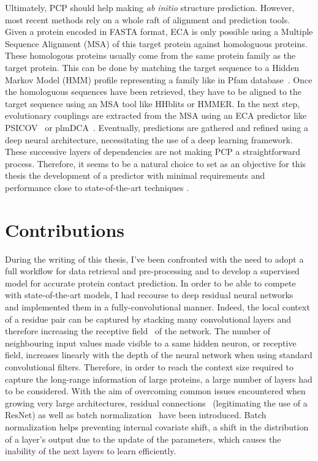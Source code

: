     Ultimately, PCP should help making \textit{ab initio} structure prediction.
    However, most recent methods rely on a whole raft of alignment and prediction tools.
    Given a protein encoded in FASTA format, ECA is only possible using a Multiple Sequence Alignment (MSA)
    of this target protein against homologuous proteins.
    These homologous proteins usually come from the same protein family
    as the target protein.
    This can be done by matching the target sequence to a Hidden Markov Model (HMM) profile representing a family
    like in Pfam database~\cite{Pfam}. Once the homologuous sequences have been retrieved, they have to be aligned to
    the target sequence using an MSA tool like HHblits or HMMER. In the next step, evolutionary couplings are extracted from
    the MSA using an ECA predictor like PSICOV~\cite{doi:10.1093/bioinformatics/btr638} or plmDCA~\cite{EKEBERG2014341}.
    Eventually, predictions are gathered and refined using a deep neural architecture, necessitating the use
    of a deep learning framework. These successive layers of dependencies are not making PCP a straightforward process.
    Therefore, it seems to be a natural choice to set as an objective for this thesis the development of a predictor with
    minimal requirements and performance close to state-of-the-art techniques
    \cite{RaptorX, DeepContact, doi:10.1093/bioinformatics/bty341, Michel383133, DeepMind}.

\section{Contributions}

    During the writing of this thesis, I've been confronted with the need to
    adopt a full workflow for data retrieval and pre-processing and to develop a supervised
    model for accurate protein contact prediction. In order to be able to compete
    with state-of-the-art models, I had recourse to deep residual
    neural networks~\cite{DBLP:journals/corr/HeZRS15} and implemented them in a
    fully-convolutional manner.
    Indeed, the local context of a residue pair can be captured by stacking many
    convolutional layers and therefore increasing the receptive field~\cite{Hubel1962}
    of the network. The number of neighbouring input values made visible to a same hidden neuron,
    or receptive field, increases linearly with the depth
    of the neural network when using standard convolutional filters.
    Therefore, in order to reach the context size required to capture the long-range information
    of large proteins, a large number of layers had to be considered.
    With the aim of overcoming common issues
    encountered when growing very large architectures,
    residual connections~\cite{DBLP:journals/corr/HeZRS15}
    (legitimating the use of a ResNet) as well as batch
    normalization~\cite{DBLP:journals/corr/IoffeS15} have been introduced.
    Batch normalization helps preventing internal covariate shift,
    a shift in the distribution of a layer's output due to the update of the parameters,
    which causes the inability of the next layers to learn efficiently.

